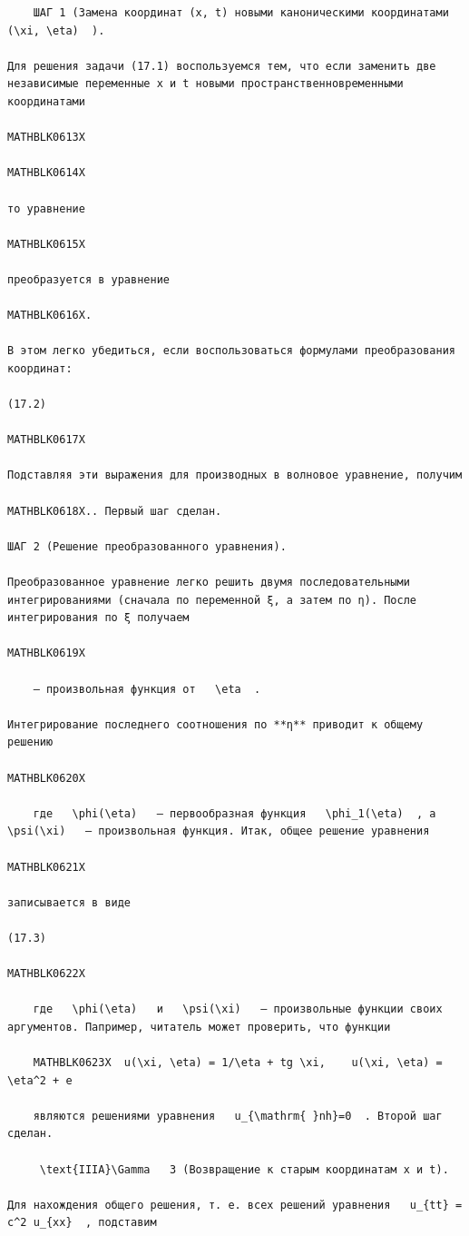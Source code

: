 \documentclass[
]{article}
\begin{document}
\begin{verbatim}
    ШАГ 1 (Замена координат (x, t) новыми каноническими координатами   (\xi, \eta)  ).

Для решения задачи (17.1) воспользуемся тем, что если заменить две независимые переменные x и t новыми пространственновременными координатами

MATHBLK0613X

MATHBLK0614X

то уравнение

MATHBLK0615X

преобразуется в уравнение

MATHBLK0616X.

В этом легко убедиться, если воспользоваться формулами преобразования координат:

(17.2)

MATHBLK0617X

Подставляя эти выражения для производных в волновое уравнение, получим

MATHBLK0618X.. Первый шаг сделан.

ШАГ 2 (Решение преобразованного уравнения).

Преобразованное уравнение легко решить двумя последовательными интегрированиями (сначала по переменной ξ, а затем по η). После интегрирования по ξ получаем

MATHBLK0619X

    — произвольная функция от   \eta  .

Интегрирование последнего соотношения по **η** приводит к общему решению

MATHBLK0620X

    где   \phi(\eta)   — первообразная функция   \phi_1(\eta)  , а   \psi(\xi)   — произвольная функция. Итак, общее решение уравнения

MATHBLK0621X

записывается в виде

(17.3)

MATHBLK0622X

    где   \phi(\eta)   и   \psi(\xi)   — произвольные функции своих аргументов. Папример, читатель может проверить, что функции

    MATHBLK0623X  u(\xi, \eta) = 1/\eta + tg \xi,    u(\xi, \eta) = \eta^2 + e

    являются решениями уравнения   u_{\mathrm{ }nh}=0  . Второй шаг сделан.

     \text{IIIA}\Gamma   3 (Возвращение к старым координатам x и t).

Для нахождения общего решения, т. е. всех решений уравнения   u_{tt} = c^2 u_{xx}  , подставим


\end{verbatim}
\end{document}
